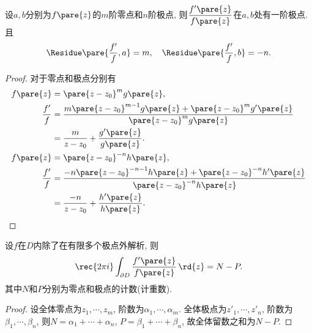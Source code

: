 \documentclass{ctexart}
\begin{document}
\begin{proposition}
    设$a,b$分别为$f\pare{z}$的$m$阶零点和$n$阶极点, 则$\displaystyle \frac{f'\pare{z}}{f\pare{z}}$在$a,b$处有一阶极点. 且
    \[ \Residue \pare{\frac{f'}{f}, a} = m,\quad \Residue \pare{\frac{f'}{f}, b} = -n. \]
\end{proposition}
\begin{proof}对于零点和极点分别有
    \begin{align*}
        f\pare{z} &= \pare{z-z_0}^m g\pare{z}, \\
        \frac{f'}{f} &= \frac{m\pare{z-z_0}^{m-1}g\pare{z} + \pare{z-z_0}^m g'\pare{z}}{\pare{z-z_0}^m g\pare{z}} \\
        &= \frac{m}{z-z_0} + \frac{g'\pare{z}}{g\pare{z}}. \\
        f\pare{z} &= \pare{z-z_0}^{-n} h\pare{z}, \\
        \frac{f'}{f} &= \frac{-n\pare{z-z_0}^{-n-1}h\pare{z} + \pare{z-z_0}^{-n}h'\pare{z}}{\pare{z-z_0}^{-n} h\pare{z}} \\
        &= \frac{-n}{z-z_0} + \frac{h'\pare{z}}{h\pare{z}}. \qedhere
    \end{align*}
\end{proof}
\begin{theorem}[有极点的辐角原理]
    设$f$在$D$内除了在有限多个极点外解析, 则
    \[ \rec{2\pi i} \int_{\partial D} \frac{f'\pare{z}}{f\pare{z}}\,\rd{z} = N - P. \]
    其中$N$和$P$分别为零点和极点的计数(计重数).
\end{theorem}
\begin{proof}
    设全体零点为$z_1,\cdots, z_m$, 阶数为$\alpha_1,\cdots, \alpha_m$. 全体极点为$z'_1,\cdots, z'_n$, 阶数为$\beta_1,\cdots, \beta_n$, 则$N = \alpha_1+\cdots+\alpha_n$, $P=\beta_1+\cdots+\beta_n$, 故全体留数之和为$N-P$.
\end{proof}
\begin{figure}[ht]
    \centering
    \caption{}
    \label{fig:零点计数例1图}
\end{figure}
\end{document}
